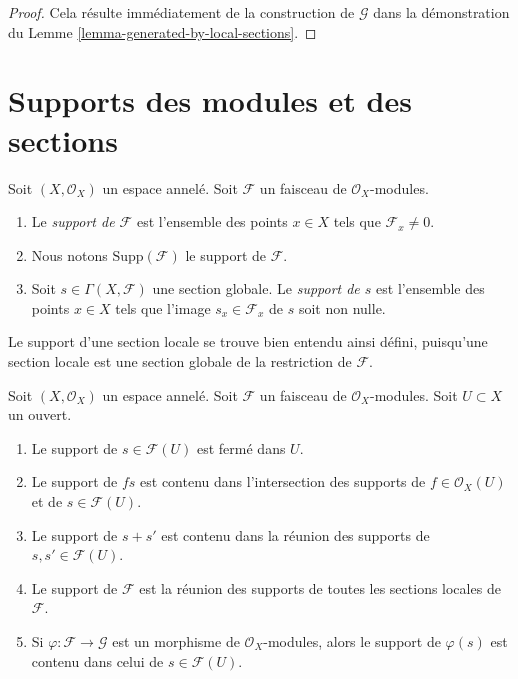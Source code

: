 \begin{proof}
Cela résulte immédiatement de la construction de $\mathcal{G}$ dans la
démonstration du Lemme \ref{lemma-generated-by-local-sections}.
\end{proof}










\section{Supports des modules et des sections}
\label{section-support}

\begin{definition}
\label{definition-support}
Soit $(X, \mathcal{O}_X)$ un espace annelé. Soit $\mathcal{F}$ un faisceau de
$\mathcal{O}_X$-modules.
\begin{enumerate}
\item Le {\it support de $\mathcal{F}$} est l'ensemble des points
$x \in X$ tels que $\mathcal{F}_x \not = 0$.
\item Nous notons $\text{Supp}(\mathcal{F})$ le support de $\mathcal{F}$.
\item Soit $s \in \Gamma(X, \mathcal{F})$ une section globale. Le
{\it support de $s$} est l'ensemble des points $x \in X$ tels que l'image
$s_x \in \mathcal{F}_x$ de $s$ soit non nulle.
\end{enumerate}
\end{definition}

\noindent
Le support d'une section locale se trouve bien entendu ainsi défini, puisqu'une
section locale est une section globale de la restriction de $\mathcal{F}$.

\begin{lemma}
\label{lemma-support-section-closed}
Soit $(X, \mathcal{O}_X)$ un espace annelé. Soit $\mathcal{F}$ un faisceau de
$\mathcal{O}_X$-modules. Soit $U \subset X$ un ouvert.
\begin{enumerate}
\item Le support de $s \in \mathcal{F}(U)$ est fermé dans $U$.
\item Le support de $fs$ est contenu dans l'intersection des supports de
$f \in \mathcal{O}_X(U)$ et de $s \in \mathcal{F}(U)$.
\item Le support de $s + s'$ est contenu dans la réunion des supports de
$s, s' \in \mathcal{F}(U)$.
\item Le support de $\mathcal{F}$ est la réunion des supports de toutes les
sections locales de $\mathcal{F}$.
\item Si $\varphi : \mathcal{F} \to \mathcal{G}$ est un morphisme de
$\mathcal{O}_X$-modules, alors le support de $\varphi(s)$ est contenu dans
celui de $s \in \mathcal{F}(U)$.
\end{enumerate}
\end{lemma}

